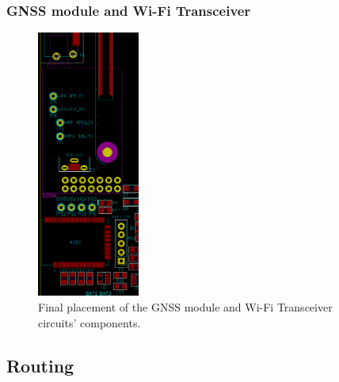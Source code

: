 \subsubsection{GNSS module and Wi-Fi Transceiver}\label{sec:5117_ZED_XBEE}

\begin{figure}[h]
	\centering
	\includegraphics[width=0.3\textwidth]{Chapters/Figures/chapter5/placement_ZED_XBEE.png}
	\caption{Final placement of the GNSS module and Wi-Fi Transceiver circuits' components.}
	\label{fig:placement_ZED_XBEE}
\end{figure}%


\subsection{Routing}\label{sec:52_Routing}




